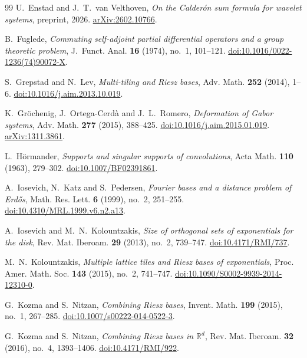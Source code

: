 \documentclass[a4paper,12pt,reqno]{amsart}
\theoremstyle{remark}
\numberwithin{equation}{section}
\newcommand{\R}{\mathbb R}
\begin{document}
\begin{thebibliography}{99}
U.~Enstad and J.~T.~van Velthoven,
\emph{On the Calder\'on sum formula for wavelet systems},
preprint, 2026.
\href{https://arxiv.org/abs/2602.10766}{arXiv:2602.10766}.

B.~Fuglede,
\emph{Commuting self-adjoint partial differential operators and a group
theoretic problem},
J.~Funct. Anal. \textbf{16} (1974), no.~1, 101--121.
\href{https://doi.org/10.1016/0022-1236(74)90072-X}{doi:10.1016/0022-1236(74)90072-X}.

S.~Grepstad and N.~Lev,
\emph{Multi-tiling and Riesz bases},
Adv. Math. \textbf{252} (2014), 1--6.
\href{https://doi.org/10.1016/j.aim.2013.10.019}{doi:10.1016/j.aim.2013.10.019}.

K.~Gr\"ochenig, J.~Ortega-Cerdà and J.~L.~Romero,
\emph{Deformation of Gabor systems},
Adv. Math. \textbf{277} (2015), 388--425.
\href{https://doi.org/10.1016/j.aim.2015.01.019}{doi:10.1016/j.aim.2015.01.019}.
\href{https://arxiv.org/abs/1311.3861}{arXiv:1311.3861}.

L.~H\"ormander,
\emph{Supports and singular supports of convolutions},
Acta Math. \textbf{110} (1963), 279--302.
\href{https://doi.org/10.1007/BF02391861}{doi:10.1007/BF02391861}.

A.~Iosevich, N.~Katz and S.~Pedersen,
\emph{Fourier bases and a distance problem of Erd\H{o}s},
Math. Res. Lett. \textbf{6} (1999), no.~2, 251--255.
\href{https://doi.org/10.4310/MRL.1999.v6.n2.a13}{doi:10.4310/\allowbreak MRL.1999.v6.n2.a13}.

A.~Iosevich and M.~N.~Kolountzakis,
\emph{Size of orthogonal sets of exponentials for the disk},
Rev. Mat. Iberoam. \textbf{29} (2013), no.~2, 739--747.
\href{https://doi.org/10.4171/RMI/737}{doi:10.4171/RMI/737}.

M.~N.~Kolountzakis,
\emph{Multiple lattice tiles and Riesz bases of exponentials},
Proc. Amer. Math. Soc. \textbf{143} (2015), no.~2, 741--747.
\href{https://doi.org/10.1090/S0002-9939-2014-12310-0}{doi:10.1090/S0002-9939-2014-12310-0}.

G.~Kozma and S.~Nitzan,
\emph{Combining Riesz bases},
Invent. Math. \textbf{199} (2015), no.~1, 267--285.
\href{https://doi.org/10.1007/s00222-014-0522-3}{doi:10.1007/s00222-014-0522-3}.

G.~Kozma and S.~Nitzan,
\emph{Combining Riesz bases in $\R^d$},
Rev. Mat. Iberoam. \textbf{32} (2016), no.~4, 1393--1406.
\href{https://doi.org/10.4171/RMI/922}{doi:10.4171/RMI/922}.


\end{thebibliography}
\end{document}

